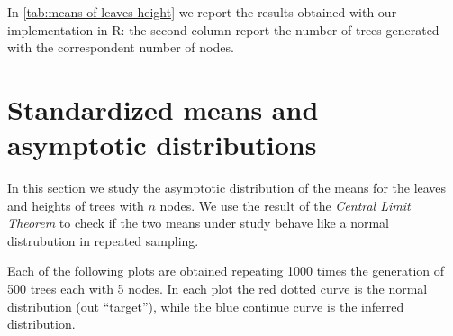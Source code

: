 In \autoref{tab:means-of-leaves-height} we report the results
obtained with our implementation in R: the second column report the
number of trees generated with the correspondent number of nodes.
\begin{table}[!ht]
  \begin{center}
    \label{tab:means-of-leaves-height}
    \caption{Theoretical and empirical means for leaves and height}
  \end{center}
\end{table}

\section{Standardized means and asymptotic distributions}

In this section we study the asymptotic distribution of the means for
the leaves and heights of trees with $n$ nodes. We use the result of
the \emph{Central Limit Theorem} to check if the two means under study
behave like a normal distrubution in repeated sampling.

Each of the following plots are obtained repeating 1000 times the
generation of 500 trees each with 5 nodes. In each plot the red dotted
curve is the normal distribution (out ``target''), while the blue
continue curve is the inferred distribution.

